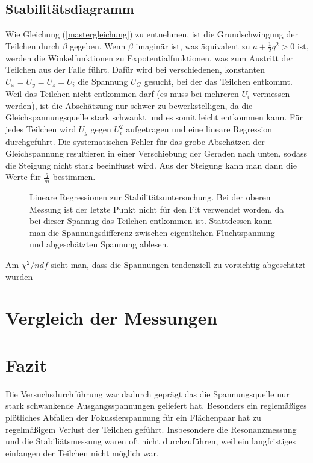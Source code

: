 \documentclass[a4paper,12pt]{article}
\begin{document}
\subsection{Stabilitätsdiagramm}
Wie Gleichung (\ref{mastergleichung}) zu entnehmen, ist die Grundschwingung der Teilchen durch $β$ gegeben.
Wenn $β$ imaginär ist, was äquivalent zu $ a + \frac12q^2 >0$ ist, werden die Winkelfunktionen zu Expotentialfunktionen, was zum Austritt der Teilchen aus der Falle führt.
Dafür wird bei verschiedenen, konstanten $U_x = U_y = U_z = U_i$ die Spannung $U_G$ gesucht, bei der das Teilchen entkommt.
Weil das Teilchen nicht entkommen darf (es muss bei mehreren $U_i$ vermessen werden), ist die Abschätzung nur schwer zu bewerkstelligen, da die Gleichspannungsquelle stark schwankt und es somit leicht entkommen kann.
Für jedes Teilchen wird $U_g$ gegen $U_i^2$ aufgetragen und eine lineare Regression durchgeführt.
Die systematischen Fehler für das grobe Abschätzen der Gleichspannung resultieren in einer Verschiebung der Geraden nach unten, sodass die Steigung nicht stark beeinflusst wird.
Aus der Steigung kann man dann die Werte für $\frac{q}{m}$ bestimmen.
\begin{figure}[htb]
		\centering
		\caption{Lineare Regressionen zur Stabilitätsuntersuchung.
		Bei der oberen Messung ist der letzte Punkt nicht für den Fit verwendet worden, da bei dieser Spannug das Teilchen entkommen ist.
		Stattdessen kann man die Spannungsdifferenz zwischen eigentlichen Fluchtspannung und abgeschätzten Spannung ablesen.}
\end{figure}
Am $χ^2/ndf$ sieht man, dass die Spannungen tendenziell zu vorsichtig abgeschätzt wurden




\section{Vergleich der Messungen}

\section{Fazit}
Die Versuchsdurchführung war dadurch geprägt das die Spannungsquelle nur stark schwankende Ausgangsspannungen geliefert hat. Besonders ein reglemäßiges plötliches Abfallen der Fokussierspannung für ein 
Flächenpaar hat zu regelmäßigem Verlust der Teilchen geführt. Insbesondere die Resonanzmessung und die Stabiliätsmessung waren oft nicht durchzuführen, weil ein langfristiges einfangen der Teilchen nicht
möglich war.

\end{document}
